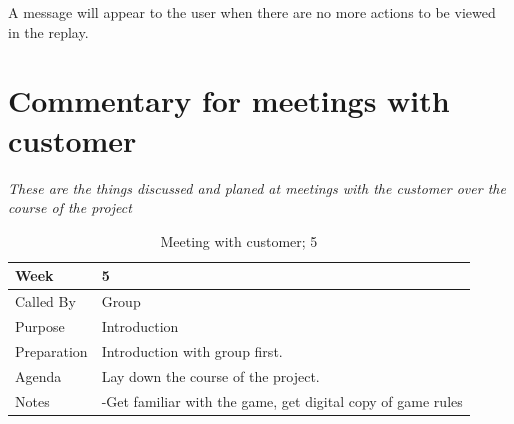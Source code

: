 \noindent A message will appear to the user when there are no more actions to be viewed in the replay.


\chapter{Commentary for meetings with customer}
\label{appendix:E}
%
\emph{These are the things discussed and planed at meetings with the customer over the course of the project}
%
%

{\footnotesize
\begin{table}[H]
\begin{tabular}{| p{5cm} | p{10cm} |}\hline
	\textbf{Week}	& \textbf{5} \\ \hline
	Called	By		& Group\\ \hline
	Purpose		& Introduction\\ \hline
	Preparation 
		& Introduction with group first. \\ 
		
	Agenda
		& Lay down the course of the project. \\

	Notes	& -Get familiar with the game, get digital copy of game rules\\ \hline
	
\end{tabular}


\caption{Meeting with customer; 5}
\label{fig:meeting_5}
\end{table}}



